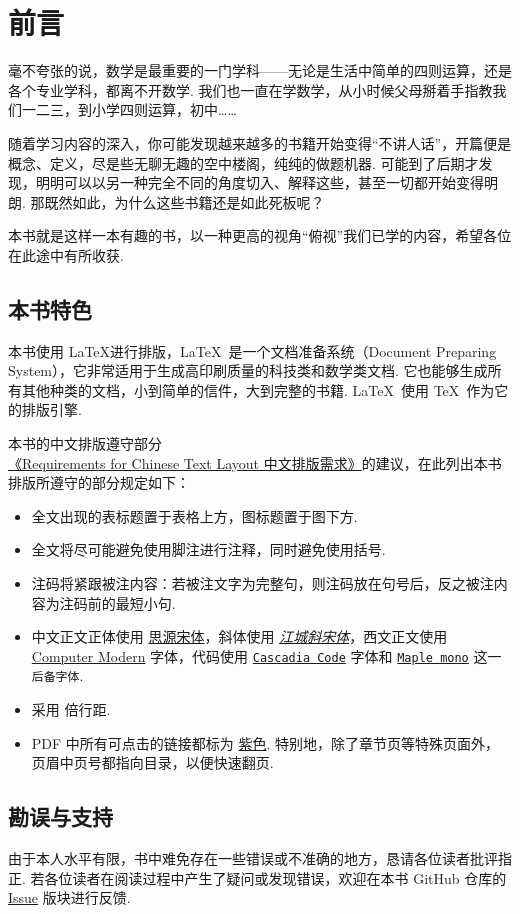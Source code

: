 \chapter{前言}

毫不夸张的说，数学是最重要的一门学科——无论是生活中简单的四则运算，还是各个专业学科，都离不开数学. 我们也一直在学数学，从小时候父母掰着手指教我们一二三，到小学四则运算，初中……

随着学习内容的深入，你可能发现越来越多的书籍开始变得“不讲人话”，开篇便是概念、定义，尽是些无聊无趣的空中楼阁，纯纯的做题机器. 可能到了后期才发现，明明可以以另一种完全不同的角度切入、解释这些，甚至一切都开始变得明朗. 那既然如此，为什么这些书籍还是如此死板呢？

本书就是这样一本有趣的书，以一种更高的视角“俯视”我们已学的内容，希望各位在此途中有所收获.

\section*{本书特色}

本书使用 \LaTeX 进行排版，\LaTeX\ 是一个文档准备系统（Document Preparing System），它非常适用于生成高印刷质量的科技类和数学类文档. 它也能够生成所有其他种类的文档，小到简单的信件，大到完整的书籍. \LaTeX\ 使用 \TeX\ 作为它的排版引擎. \cite{lshort}

本书的中文排版遵守部分\href{https://w3c.github.io/clreq}{《Requirements for Chinese Text Layout 中文排版需求》}的建议，在此列出本书排版所遵守的部分规定如下：

\begin{itemize}
  \item 全文出现的表标题置于表格上方，图标题置于图下方.
  \item 全文将尽可能避免使用脚注进行注释，同时避免使用括号.
  \item 注码将紧跟被注内容：若被注文字为完整句，则注码放在句号后，反之被注内容为注码前的最短小句.
  \item 中文正文正体使用 \href{https://github.com/adobe-fonts/source-han-serif}{思源宋体}，斜体使用 \href{https://www.maoken.com/freefonts/4679.html}{\textit{江城斜宋体}}，西文正文使用 \href{https://en.wikipedia.org/wiki/Computer_Modern}{Computer Modern} 字体，代码使用 \href{https://github.com/microsoft/cascadia-code}{\texttt{Cascadia Code}} 字体和 \href{https://github.com/subframe7536/maple-font}{\texttt{Maple mono}} 这一 \texttt{后备字体}.
  \item 采用  倍行距.
  \item PDF 中所有可点击的链接都标为 \href{https://www.color-hex.com/color/c678dd}{紫色}. 特别地，除了章节页等特殊页面外，页眉中页号都指向目录，以便快速翻页.
\end{itemize}

\section*{勘误与支持}

由于本人水平有限，书中难免存在一些错误或不准确的地方，恳请各位读者批评指正. 若各位读者在阅读过程中产生了疑问或发现错误，欢迎在本书 GitHub 仓库的 \href{https://github.com/Cierra-Runis/math/issues}{Issue} 版块进行反馈.

\begin{flushright}
  \href{https://github.com/Cierra-Runis}{\creator} \\
  \latestdate
\end{flushright}
